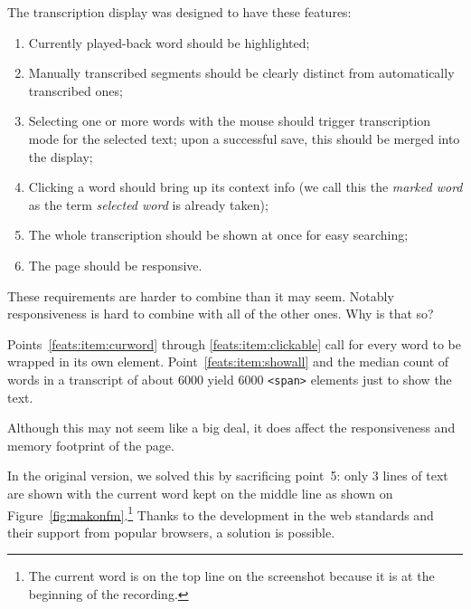 \documentclass{svproc}
\begin{document}
The transcription display was designed to have these features:
\begin{enumerate}
\item{
    Currently played-back word should be highlighted;
    \label{feats:item:curword}
}
\item{
    Manually transcribed segments should be clearly distinct from automatically
    transcribed ones;
    \label{feats:item:manualdistinct}
}
\item{
    Selecting one or more words with the mouse should trigger transcription mode
    for the selected text;
    upon a successful save, this should be merged into the display;
    \label{feats:item:selectable}
}
\item{
    Clicking a word should bring up its context info (we call this the
    {\em marked word} as the term {\em selected word} is already taken);
    \label{feats:item:clickable}
}
\item{
    The whole transcription should be shown at once for easy searching;
    \label{feats:item:showall}
}
\item{
    The page should be responsive.\label{feats:item:speed}
}
\end{enumerate}

These requirements are harder to combine than it may seem. Notably
responsiveness is hard to combine with all of the other ones. Why is that so?

Points~\ref{feats:item:curword} through \ref{feats:item:clickable}
call for every word to be wrapped in its own element.
Point~\ref{feats:item:showall} and the median count of words in a transcript of
about 6000 yield 6000 \texttt{<span>} elements just to show the text. 

Although this may not seem like a big deal, it does affect the responsiveness
and memory footprint of the page.

In the original version, we solved this by sacrificing point~5:
only 3 lines of text are shown with the current word kept on the middle line as
shown on Figure~\ref{fig:makonfm}.\footnote{The current word is on the top line
on the screenshot because it is at the beginning of the recording.} Thanks to
the development in the web standards and their support from popular browsers, a
solution is possible.
\end{document}
